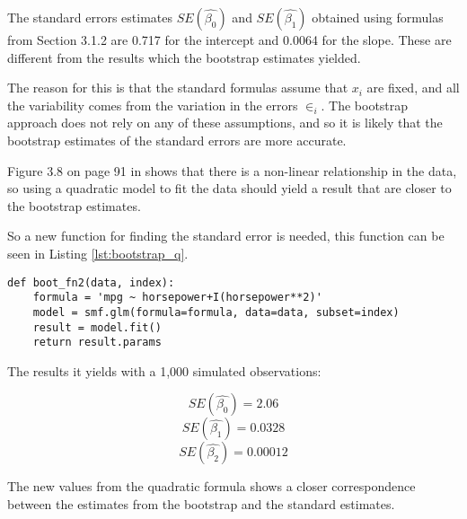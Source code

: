 The standard errors estimates $SE(\hat{\beta_0})$ and $SE(\hat{\beta_1})$ obtained using formulas from Section 3.1.2\citep{ISLR} are 0.717 for the intercept and 0.0064 for the slope. These are different from the results which the bootstrap estimates yielded.

The reason for this is that the standard formulas assume that $x_i$ are fixed, and all the variability comes from the variation in the errors $\in_i$. The bootstrap approach does not rely on any of these assumptions, and so it is likely that the bootstrap estimates of the standard errors are more accurate.

Figure 3.8 on page 91 in \citep{ISLR} shows that there is a non-linear relationship in the data, so using a quadratic model to fit the data should yield a result that are closer to the bootstrap estimates.

So a new function for finding the standard error is needed, this function can be seen in Listing \ref{lst:bootstrap_q}.

\begin{lstlisting}[caption={Function to calculate standard error with a qudratic model}, label=lst:bootstrap_q, mathescape=true]
def boot_fn2(data, index):
	formula = 'mpg ~ horsepower+I(horsepower**2)'
	model = smf.glm(formula=formula, data=data, subset=index)
	result = model.fit()
	return result.params
\end{lstlisting}

The results it yields with a 1,000 simulated observations:

\begin{equation}
SE(\hat{\beta_0}) = 2.06
\end{equation}
\begin{equation}
SE(\hat{\beta_1}) = 0.0328
\end{equation}
\begin{equation}
SE(\hat{\beta_2}) = 0.00012
\end{equation}

The new values from the quadratic formula shows a closer correspondence between the estimates from the bootstrap and the standard estimates.